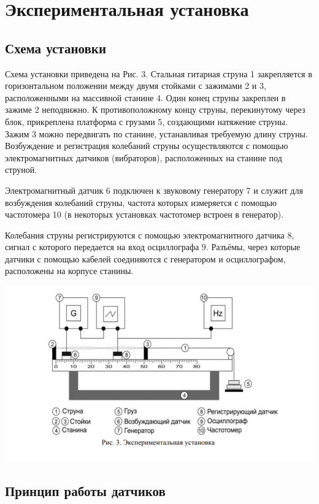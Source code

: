 \documentclass[a4paper, 12pt]{article} %
\begin{document}
\section{Экспериментальная установка}

\subsection{Схема установки}

Схема установки приведена на Рис. 3. Стальная гитарная струна 1 закрепляется в горизонтальном положении между двумя стойками с зажимами 2 и 3,
расположенными на массивной станине 4. Один конец струны закреплен в
зажиме 2 неподвижно. К противоположному концу струны, перекинутому через блок, прикреплена платформа с грузами 5, создающими натяжение
струны. Зажим 3 можно передвигать по станине, устанавливая требуемую
длину струны. Возбуждение и регистрация колебаний струны осуществляются с помощью электромагнитных датчиков (вибраторов), расположенных
на станине под струной. 

Электромагнитный датчик 6 подключен к звуковому
генератору 7 и служит для возбуждения колебаний струны, частота которых
измеряется с помощью частотомера 10 (в некоторых установках частотомер
встроен в генератор). 

Колебания струны регистрируются с помощью электромагнитного датчика 8, сигнал с которого передается на вход осциллографа 9.
Разъёмы, через которые датчики с помощью кабелей соединяются с генератором и осциллографом, расположены на корпусе станины.

\includegraphics[width=\textwidth]{1.4.5 4}

\subsection{Принцип работы датчиков}
\end{document}
